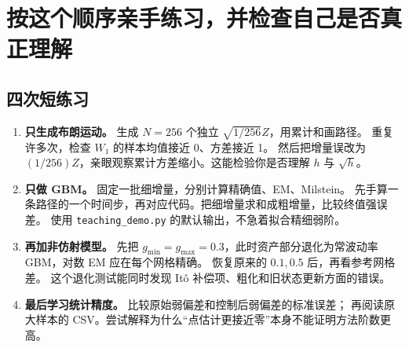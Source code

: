 \documentclass[11pt,a4paper,fontset=none]{ctexart}
\numberwithin{equation}{section}
\begin{document}
\section{按这个顺序亲手练习，并检查自己是否真正理解}\label{sec:practice}
\subsection{四次短练习}
\begin{enumerate}
\item \textbf{只生成布朗运动。} 生成 $N=256$ 个独立 $\sqrt{1/256}Z$，用累计和画路径。
重复许多次，检查 $W_1$ 的样本均值接近 0、方差接近 1。
然后把增量误改为 $(1/256)Z$，亲眼观察累计方差缩小。这能检验你是否理解 $h$ 与 $\sqrt h$。
\item \textbf{只做 GBM。} 固定一批细增量，分别计算精确值、EM、Milstein。
先手算一条路径的一个时间步，再对应代码。把细增量求和成粗增量，比较终值强误差。
使用 \texttt{teaching\_demo.py} 的默认输出，不急着拟合精细弱阶。
\item \textbf{再加非仿射模型。} 先把 $g_{\min}=g_{\max}=0.3$，此时资产部分退化为常波动率 GBM，对数 EM 应在每个网格精确。
恢复原来的 $0.1,0.5$ 后，再看参考网格差。
这个退化测试能同时发现 Itô 补偿项、粗化和旧状态更新方面的错误。
\item \textbf{最后学习统计精度。} 比较原始弱偏差和控制后弱偏差的标准误差；
再阅读原大样本的 CSV。尝试解释为什么“点估计更接近零”本身不能证明方法阶数更高。
\end{enumerate}
\end{document}
